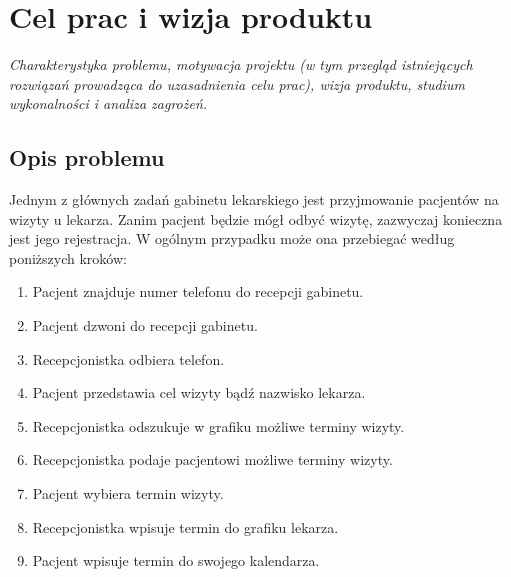 \documentclass[polish,12pt]{aghthesis}
\author{Wojciech Karpiel\\ Michał Hamuda\\ Filip Galas}
\date{2017}
\begin{document}
\maketitle

\tableofcontents

\newpage

\section{Cel prac i wizja produktu}
\label{sec:cel-wizja}
\emph{Charakterystyka problemu, motywacja projektu (w tym przegląd
  istniejących rozwiązań prowadząca do uzasadnienia celu prac),
  wizja produktu, studium wykonalności i analiza zagrożeń.}
  
\subsection{Opis problemu}
Jednym z głównych zadań gabinetu lekarskiego jest przyjmowanie pacjentów na wizyty u lekarza. Zanim pacjent będzie mógł odbyć wizytę, zazwyczaj konieczna jest jego rejestracja. W ogólnym przypadku może ona przebiegać według poniższych kroków:

\begin{enumerate}
  \item Pacjent znajduje numer telefonu do recepcji gabinetu.
  \item Pacjent dzwoni do recepcji gabinetu.
  \item Recepcjonistka odbiera telefon.
  \item Pacjent przedstawia cel wizyty bądź nazwisko lekarza.
  \item Recepcjonistka odszukuje w grafiku możliwe terminy wizyty.
  \item Recepcjonistka podaje pacjentowi możliwe terminy wizyty.
  \item Pacjent wybiera termin wizyty.
  \item Recepcjonistka wpisuje termin do grafiku lekarza.
  \item Pacjent wpisuje termin do swojego kalendarza.
\end{enumerate}
\end{document}
